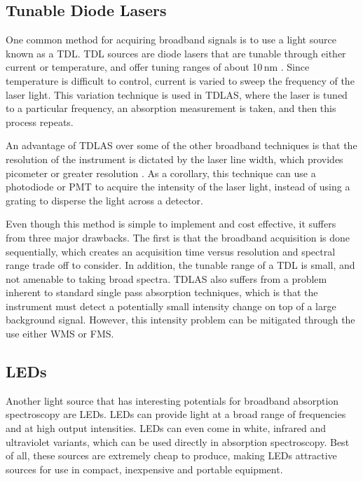 \subsection{Tunable Diode Lasers}\label{subsec:tdl}

One common method for acquiring broadband signals is to use a light source
known as a \acf{TDL}. \ac{TDL} sources are diode lasers that are tunable
through either current or temperature, and offer tuning ranges of about 10\,nm
\cite{May:1998ue}. Since temperature is difficult to control, current is
varied to sweep the frequency of the laser light. This variation technique is
used in \ac{TDLAS}, where the laser is tuned to a particular frequency, an
absorption measurement is taken, and then this process repeats.

An advantage of \ac{TDLAS} over some of the other broadband techniques is
that the resolution of the instrument is dictated by the laser line width,
which provides picometer or greater resolution \cite{Berden:2009wk}. As a
corollary, this technique can use a photodiode or \ac{PMT} to acquire
the intensity of the laser light, instead of using a grating to disperse the
light across a detector.


Even though this method is simple to implement and cost effective, it suffers
from three major drawbacks. The first is that the broadband acquisition is
done sequentially, which creates an acquisition time versus resolution and
spectral range trade off to consider. In addition, the tunable range of a
\ac{TDL} is small, and not amenable to taking broad spectra. \ac{TDLAS} also
suffers from a problem inherent to standard single pass absorption techniques,
which is that the instrument must detect a potentially small intensity change
on top of a large background signal. However, this intensity problem can be
mitigated through the use either \ac{WMS} \cite{Reid:1981vq} or \ac{FMS}.



\subsection{LEDs}\label{subsec:led}

Another light source that has interesting potentials for broadband absorption
spectroscopy are \acp{LED}. \acp{LED} can provide light at a broad range of
frequencies and at high output intensities. \acp{LED} can even come in white,
infrared and ultraviolet variants, which can be used directly in absorption
spectroscopy. Best of all, these sources are extremely cheap to produce, making
\acp{LED} attractive sources for use in compact, inexpensive and portable
equipment.

